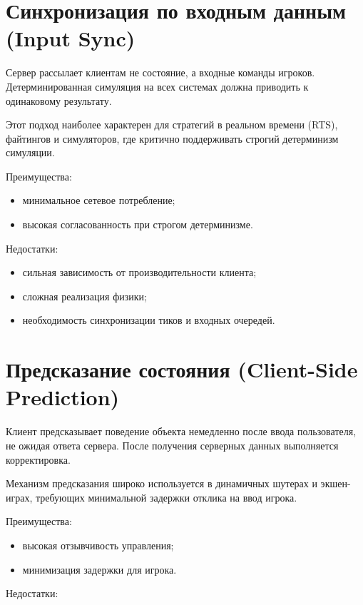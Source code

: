 \section{Синхронизация по входным данным (Input Sync)}

Сервер рассылает клиентам не состояние, а входные команды игроков. Детерминированная симуляция\cite{photon_sync}
на всех системах должна приводить к одинаковому результату.

Этот подход наиболее характерен для стратегий в реальном времени (RTS), файтингов и симуляторов, где критично поддерживать строгий детерминизм симуляции.


Преимущества:

\begin{itemize}
    \item минимальное сетевое потребление;
    \item высокая согласованность при строгом детерминизме.
\end{itemize}

Недостатки:

\begin{itemize}
    \item сильная зависимость от производительности клиента;
    \item сложная реализация физики;
    \item необходимость синхронизации тиков и входных очередей.
\end{itemize}

\section{Предсказание состояния (Client-Side Prediction)}

Клиент предсказывает поведение объекта немедленно после ввода пользователя, не ожидая
ответа сервера\cite{claypool2010latency}. После получения серверных данных выполняется корректировка.

Механизм предсказания широко используется в динамичных шутерах и экшен-играх, требующих минимальной задержки отклика на ввод игрока.


Преимущества:

\begin{itemize}
    \item высокая отзывчивость управления;
    \item минимизация задержки для игрока.
\end{itemize}

Недостатки:

